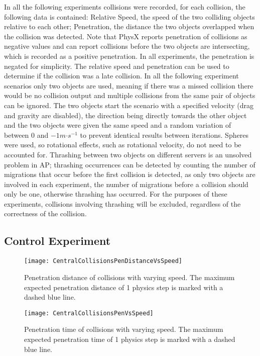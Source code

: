 In all the following experiments collisions were recorded, for each collision, the following data is contained: Relative Speed, the speed of the two colliding objects relative to each other; Penetration, the distance the two objects overlapped when the collision was detected. Note that PhysX reports penetration of collisions as negative values and can report collisions before the two objects are intersecting, which is recorded as a positive penetration. In all experiments, the penetration is negated for simplicity. The relative speed and penetration can be used to determine if the collision was a late collision. In all the following experiment scenarios only two objects are used, meaning if there was a missed collision there would be no collision output and multiple collisions from the same pair of objects can be ignored. The two objects start the scenario with a specified velocity (drag and gravity are disabled), the direction being directly towards the other object and the two objects were given the same speed and a random variation of between $0$ and $-1m\mathord{\cdot}s^{-1}$ to prevent identical results between iterations. Spheres were used, so rotational effects, such as rotational velocity, do not need to be accounted for. Thrashing between two objects on different servers is an unsolved problem in AP; thrashing occurrences can be detected by counting the number of migrations that occur before the first collision is detected, as only two objects are involved in each experiment, the number of migrations before a collision should only be one, otherwise thrashing has occurred. For the purposes of these experiments, collisions involving thrashing will be excluded, regardless of the correctness of the collision.


\subsection{Control Experiment}

\begin{figure}[t]
	\centering
	\texttt{[image: CentralCollisionsPenDistanceVsSpeed]}
	\caption{Penetration distance of collisions with varying speed. The maximum expected penetration distance of 1 physics step is marked with a dashed blue line.}
	\label{fig_ErrorControlDistance}
\end{figure}

\begin{figure}[t]
	\centering
	\texttt{[image: CentralCollisionsPenVsSpeed]}
	\caption{Penetration time of collisions with varying speed. The maximum expected penetration time of 1 physics step is marked with a dashed blue line.}
	\label{fig_ErrorControlTime}
\end{figure}

